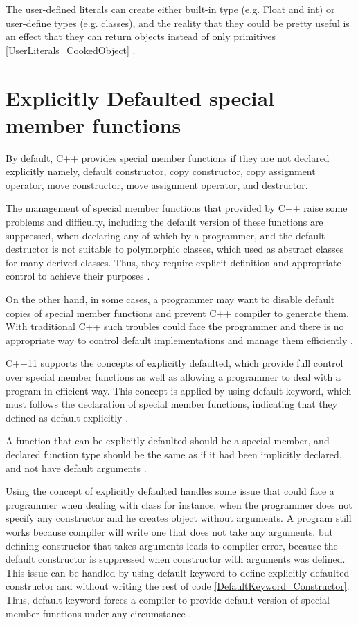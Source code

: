 \documentclass[11pt]{report}
\begin{document}
The user-defined literals can create either built-in type (e.g.  Float and int) or user-define types (e.g. classes), and the reality that they could be pretty useful is an effect that they can return objects instead of only primitives \ref{UserLiterals_CookedObject} \cite{Gregorie:professionalcpp}.


\section{Explicitly Defaulted special member functions}
\label{section: Defaulted special member functions}
By default, C++ provides special member functions if they are not declared explicitly namely, default constructor, copy constructor, copy assignment operator, move constructor, move assignment operator, and destructor.


The management of special member functions that provided by C++ raise some problems and difficulty, including the default version of these functions are suppressed, when declaring any of which by a programmer, and the default destructor is not suitable to polymorphic classes, which used as abstract classes for many derived classes. Thus, they require explicit definition and appropriate control to achieve their purposes \cite{ISO:2011:Cpplanguage}.


On the other hand, in some cases, a programmer may want to disable default copies of special member functions and prevent C++ compiler to generate them. With traditional C++ such troubles could face the programmer and there is no appropriate way to control default implementations and manage them efficiently \cite{ISO:2011:Cpplanguage}.


C++11 supports the concepts of explicitly defaulted, which provide full control over special member functions as well as allowing a programmer to deal with a program in efficient way. This concept is applied by using default keyword, which must follows the declaration of special member functions, indicating that they defined as default explicitly \cite{Prata:2012:Cpp}.


A function that can be explicitly defaulted should be a special member, and declared function type should be the same as if it had been implicitly declared, and not have default arguments \cite{ISO:2011:Cpplanguage}.


Using the concept of explicitly defaulted handles some issue that could face a programmer when dealing with class for instance, when the programmer does not specify any constructor and he creates object without arguments. A program still works because compiler will write one that does not take any arguments, but defining constructor that takes arguments leads to compiler-error, because the default constructor is suppressed when constructor with arguments was defined. This issue can be handled by using default keyword to define explicitly defaulted constructor and without writing the rest of code \ref{DefaultKeyword_Constructor}. Thus, default keyword forces a compiler to provide default version of special member functions under any circumstance \cite{Gregorie:professionalcpp}.
\end{document}
